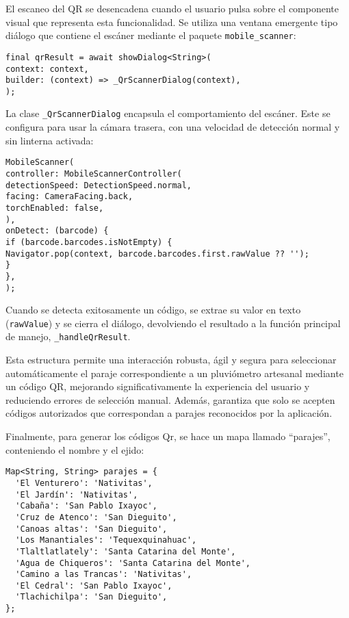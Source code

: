 El escaneo del QR se desencadena cuando el usuario pulsa sobre el componente visual que representa esta funcionalidad. Se utiliza una ventana emergente tipo diálogo que contiene el escáner mediante el paquete \texttt{mobile\_scanner}:

\begin{verbatim}
final qrResult = await showDialog<String>(
context: context,
builder: (context) => _QrScannerDialog(context),
);
\end{verbatim}

La clase \texttt{\_QrScannerDialog} encapsula el comportamiento del escáner. Este se configura para usar la cámara trasera, con una velocidad de detección normal y sin linterna activada:

\begin{verbatim}
MobileScanner(
controller: MobileScannerController(
detectionSpeed: DetectionSpeed.normal,
facing: CameraFacing.back,
torchEnabled: false,
),
onDetect: (barcode) {
if (barcode.barcodes.isNotEmpty) {
Navigator.pop(context, barcode.barcodes.first.rawValue ?? '');
}
},
);
\end{verbatim}

Cuando se detecta exitosamente un código, se extrae su valor en texto (\texttt{rawValue}) y se cierra el diálogo, devolviendo el resultado a la función principal de manejo, \texttt{\_handleQrResult}.

Esta estructura permite una interacción robusta, ágil y segura para seleccionar automáticamente el paraje correspondiente a un pluviómetro artesanal mediante un código QR, mejorando significativamente la experiencia del usuario y reduciendo errores de selección manual. Además, garantiza que solo se acepten códigos autorizados que correspondan a parajes reconocidos por la aplicación.

Finalmente, para generar los códigos Qr, se hace un mapa llamado ``parajes'', conteniendo el nombre y el ejido:

\begin{verbatim}
Map<String, String> parajes = {
  'El Venturero': 'Nativitas',
  'El Jardín': 'Nativitas',
  'Cabaña': 'San Pablo Ixayoc',
  'Cruz de Atenco': 'San Dieguito',
  'Canoas altas': 'San Dieguito',
  'Los Manantiales': 'Tequexquinahuac',
  'Tlaltlatlately': 'Santa Catarina del Monte',
  'Agua de Chiqueros': 'Santa Catarina del Monte',
  'Camino a las Trancas': 'Nativitas',
  'El Cedral': 'San Pablo Ixayoc',
  'Tlachichilpa': 'San Dieguito',
};
\end{verbatim}

